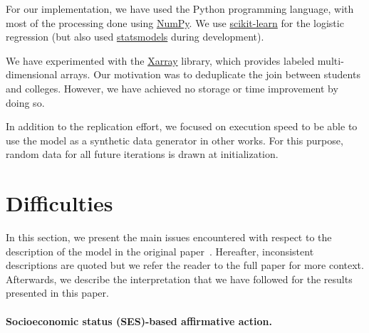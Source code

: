 For our implementation, we have used the Python programming language, with most of the processing done using \href{https://numpy.org/}{NumPy}.
We use \href{https://scikit-learn.org/}{scikit-learn} for the logistic regression (but also used
\href{https://www.statsmodels.org/}{statsmodels} during development).

We have experimented with the \href{https://xarray.dev/}{Xarray} library, which provides labeled multi-dimensional arrays. 
Our motivation was to deduplicate the join between students and colleges. 
However, we have achieved no storage or time improvement by doing so.

In addition to the replication effort, we focused on execution speed to be able to use the model as a synthetic data generator in other works. For this purpose, random data for all future iterations is drawn at initialization.

\section{Difficulties}

In this section, we present the main issues encountered with respect to the description of the model in the original paper~\cite{reardon2018levels}. 
Hereafter, inconsistent descriptions are quoted but we refer the reader to the full paper for more context.
Afterwards, we describe the interpretation that we have followed for the results presented in this paper.

\paragraph{Socioeconomic status (SES)-based affirmative action.}

